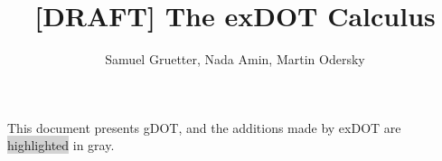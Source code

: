 \documentclass{llncs}
\begin{document}
\thispagestyle{plain}
\pagestyle{plain}
\mainmatter

\title{[DRAFT] The exDOT Calculus}
\author{Samuel Gruetter, Nada Amin, Martin Odersky}

\maketitle
\sloppy
\newcommand{\lindent}{\hspace{-4mm}}


\newcommand{\highlight}[1]{\colorbox{lightgray}{#1}}

\newcommand{\HIGHLIGHT}[1]{\colorbox{lightgray}{$#1$}}

This document presents gDOT, and the additions made by exDOT are \highlight{highlighted} in gray.


\begin{figure}
\end{figure}


\begin{figure}
\end{figure}


\begin{figure}
\figurebox{

}
\end{figure}


\begin{figure}
\end{figure}


\end{document}
